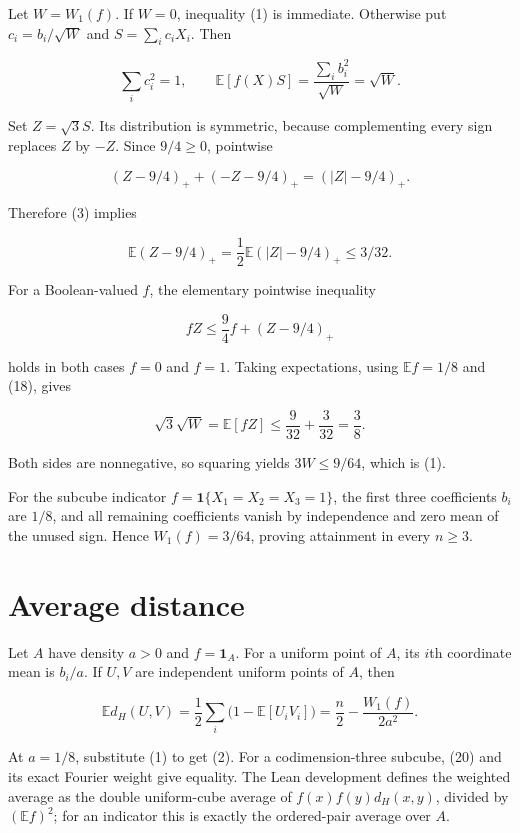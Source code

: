 \documentclass[11pt]{article}
\begin{document}
Let \(W=W_1(f)\). If \(W=0\), inequality (1) is immediate. Otherwise put
\(c_i=b_i/\sqrt W\) and \(S=\sum_i c_iX_i\). Then

\[\sum_i c_i^2=1,\qquad \mathbb E[f(X)S]=\frac{\sum_i b_i^2}{\sqrt W}=\sqrt W.\]

Set \(Z=\sqrt3S\). Its distribution is symmetric, because complementing
every sign replaces \(Z\) by \(-Z\). Since \(9/4\ge0\), pointwise

\[(Z-9/4)_++(-Z-9/4)_+=(|Z|-9/4)_+.\]

Therefore (3) implies

\[\mathbb E(Z-9/4)_+=\frac12\mathbb E(|Z|-9/4)_+\le3/32. \tag{18}\]

For a Boolean-valued \(f\), the elementary pointwise inequality

\[fZ\le\frac94 f+(Z-9/4)_+ \tag{19}\]

holds in both cases \(f=0\) and \(f=1\). Taking expectations, using
\(\mathbb Ef=1/8\) and (18), gives

\[\sqrt3\sqrt W=\mathbb E[fZ]\le\frac9{32}+\frac3{32}=\frac38.\]

Both sides are nonnegative, so squaring yields \(3W\le9/64\), which is
(1).

For the subcube indicator \(f=\mathbf1\{X_1=X_2=X_3=1\}\), the first
three coefficients \(b_i\) are \(1/8\), and all remaining coefficients
vanish by independence and zero mean of the unused sign. Hence
\(W_1(f)=3/64\), proving attainment in every \(n\ge3\).

\hypertarget{average-distance}{%
\section{Average distance}\label{average-distance}}

Let \(A\) have density \(a>0\) and \(f=\mathbf1_A\). For a uniform point
of \(A\), its \(i\)th coordinate mean is \(b_i/a\). If \(U,V\) are
independent uniform points of \(A\), then

\[\mathbb E d_H(U,V)
 =\frac12\sum_i\bigl(1-\mathbb E[U_iV_i]\bigr)
 =\frac n2-\frac{W_1(f)}{2a^2}. \tag{20}\]

At \(a=1/8\), substitute (1) to get (2). For a codimension-three
subcube, (20) and its exact Fourier weight give equality. The Lean
development defines the weighted average as the double uniform-cube
average of \(f(x)f(y)d_H(x,y)\), divided by \((\mathbb Ef)^2\); for an
indicator this is exactly the ordered-pair average over \(A\).
\end{document}
